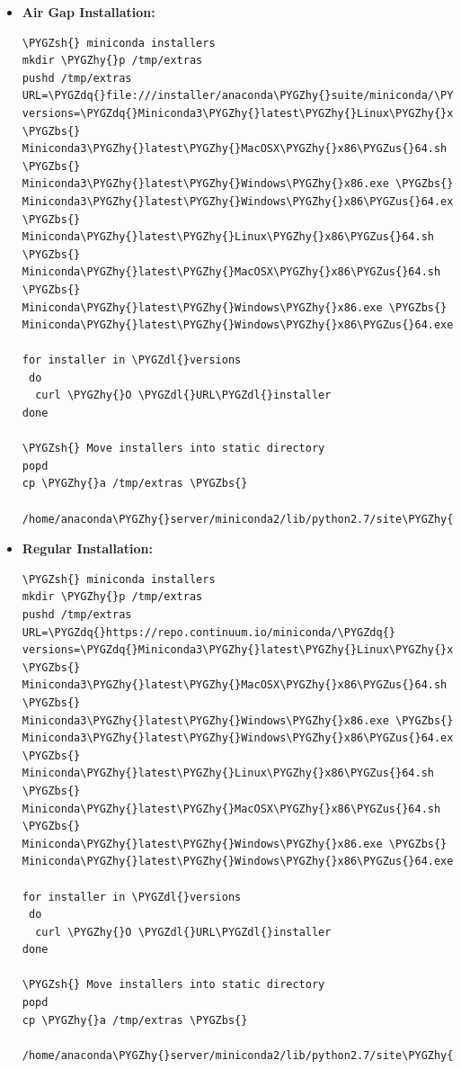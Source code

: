 \documentclass[letterpaper,10pt,openany,oneside]{sphinxmanual}
\def\PYGZbs{\char`\\}
\def\PYGZus{\char`\_}
\def\PYGZsh{\char`\#}
\def\PYGZdl{\char`\$}
\def\PYGZhy{\char`\-}
\def\PYGZdq{\char`\"}
\begin{document}
\begin{itemize}
\item {} 
\textbf{Air Gap Installation:}

\begin{Verbatim}[commandchars=\\\{\}]
\PYGZsh{} miniconda installers
mkdir \PYGZhy{}p /tmp/extras
pushd /tmp/extras
URL=\PYGZdq{}file:///installer/anaconda\PYGZhy{}suite/miniconda/\PYGZdq{}
versions=\PYGZdq{}Miniconda3\PYGZhy{}latest\PYGZhy{}Linux\PYGZhy{}x86\PYGZus{}64.sh \PYGZbs{}
Miniconda3\PYGZhy{}latest\PYGZhy{}MacOSX\PYGZhy{}x86\PYGZus{}64.sh \PYGZbs{}
Miniconda3\PYGZhy{}latest\PYGZhy{}Windows\PYGZhy{}x86.exe \PYGZbs{}
Miniconda3\PYGZhy{}latest\PYGZhy{}Windows\PYGZhy{}x86\PYGZus{}64.exe \PYGZbs{}
Miniconda\PYGZhy{}latest\PYGZhy{}Linux\PYGZhy{}x86\PYGZus{}64.sh \PYGZbs{}
Miniconda\PYGZhy{}latest\PYGZhy{}MacOSX\PYGZhy{}x86\PYGZus{}64.sh \PYGZbs{}
Miniconda\PYGZhy{}latest\PYGZhy{}Windows\PYGZhy{}x86.exe \PYGZbs{}
Miniconda\PYGZhy{}latest\PYGZhy{}Windows\PYGZhy{}x86\PYGZus{}64.exe\PYGZdq{}

for installer in \PYGZdl{}versions
 do
  curl \PYGZhy{}O \PYGZdl{}URL\PYGZdl{}installer
done

\PYGZsh{} Move installers into static directory
popd
cp \PYGZhy{}a /tmp/extras \PYGZbs{}
  /home/anaconda\PYGZhy{}server/miniconda2/lib/python2.7/site\PYGZhy{}packages/binstar/static
\end{Verbatim}

\item {} 
\textbf{Regular Installation:}

\begin{Verbatim}[commandchars=\\\{\}]
\PYGZsh{} miniconda installers
mkdir \PYGZhy{}p /tmp/extras
pushd /tmp/extras
URL=\PYGZdq{}https://repo.continuum.io/miniconda/\PYGZdq{}
versions=\PYGZdq{}Miniconda3\PYGZhy{}latest\PYGZhy{}Linux\PYGZhy{}x86\PYGZus{}64.sh \PYGZbs{}
Miniconda3\PYGZhy{}latest\PYGZhy{}MacOSX\PYGZhy{}x86\PYGZus{}64.sh \PYGZbs{}
Miniconda3\PYGZhy{}latest\PYGZhy{}Windows\PYGZhy{}x86.exe \PYGZbs{}
Miniconda3\PYGZhy{}latest\PYGZhy{}Windows\PYGZhy{}x86\PYGZus{}64.exe \PYGZbs{}
Miniconda\PYGZhy{}latest\PYGZhy{}Linux\PYGZhy{}x86\PYGZus{}64.sh \PYGZbs{}
Miniconda\PYGZhy{}latest\PYGZhy{}MacOSX\PYGZhy{}x86\PYGZus{}64.sh \PYGZbs{}
Miniconda\PYGZhy{}latest\PYGZhy{}Windows\PYGZhy{}x86.exe \PYGZbs{}
Miniconda\PYGZhy{}latest\PYGZhy{}Windows\PYGZhy{}x86\PYGZus{}64.exe\PYGZdq{}

for installer in \PYGZdl{}versions
 do
  curl \PYGZhy{}O \PYGZdl{}URL\PYGZdl{}installer
done

\PYGZsh{} Move installers into static directory
popd
cp \PYGZhy{}a /tmp/extras \PYGZbs{}
     /home/anaconda\PYGZhy{}server/miniconda2/lib/python2.7/site\PYGZhy{}packages/binstar/static
\end{Verbatim}

\end{itemize}
\end{document}
